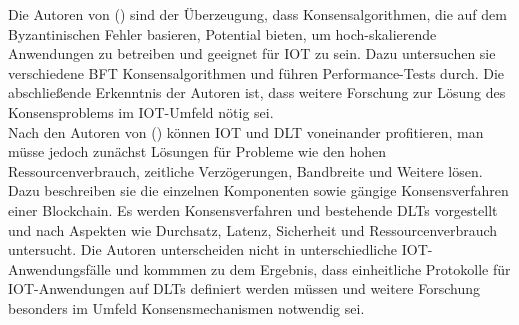 Die Autoren \citeauthor{Eval2018} von  (\cite{Eval2018}) sind der Überzeugung, dass Konsensalgorithmen, die auf dem Byzantinischen Fehler basieren, Potential bieten, um hoch-skalierende Anwendungen zu betreiben und geeignet für \ac{IOT} zu sein. Dazu untersuchen sie verschiedene \ac{BFT} Konsensalgorithmen und führen Performance-Tests durch. Die abschließende Erkenntnis der Autoren ist, dass weitere Forschung zur Lösung des Konsensproblems im \ac{IOT}-Umfeld nötig sei.\\
Nach den Autoren \citeauthor{convergence2019} von  (\cite{convergence2019}) können \ac{IOT} und \ac{DLT} voneinander profitieren, man müsse jedoch zunächst Lösungen für Probleme wie den hohen Ressourcenverbrauch, zeitliche Verzögerungen, Bandbreite und Weitere lösen. Dazu beschreiben sie die einzelnen Komponenten sowie gängige Konsensverfahren einer Blockchain. Es werden Konsensverfahren und bestehende \acp{DLT} vorgestellt und nach Aspekten wie Durchsatz, Latenz, Sicherheit und Ressourcenverbrauch untersucht. Die Autoren unterscheiden nicht in unterschiedliche \ac{IOT}-Anwendungsfälle und kommmen zu dem Ergebnis, dass
einheitliche Protokolle für \ac{IOT}-Anwendungen auf \acp{DLT} definiert werden müssen und weitere Forschung besonders im Umfeld Konsensmechanismen notwendig sei.
